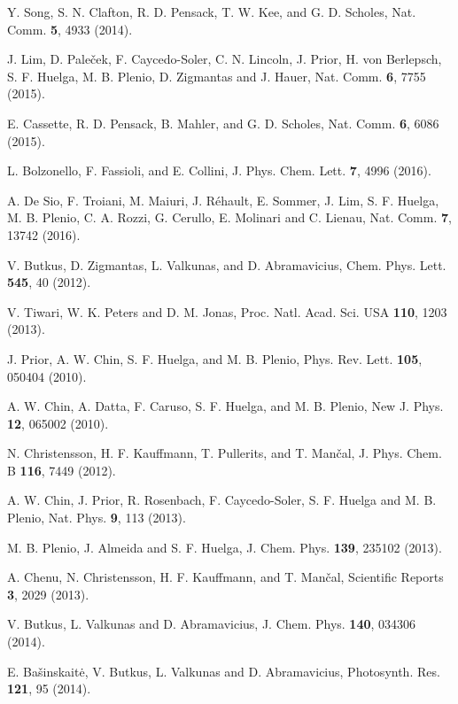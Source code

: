 \documentclass[%
 reprint,%
 amssymb, amsmath,%
 aip,cha,%
]{revtex4-1}
\begin{document}
\begin{thebibliography}{99}
 Y. Song, S. N. Clafton, R. D. Pensack, T. W. Kee, and G. D. Scholes, Nat. Comm. {\bf 5}, 4933 (2014).

 J. Lim, D. Pale{\v c}ek, F. Caycedo-Soler, C. N. Lincoln, J. Prior, H. von Berlepsch, S. F. Huelga, M. B. Plenio, D. Zigmantas and J. Hauer, Nat. Comm. {\bf 6}, 7755 (2015).

 E. Cassette, R. D. Pensack, B. Mahler, and G. D. Scholes, Nat. Comm. {\bf 6}, 6086 (2015).

 L. Bolzonello, F. Fassioli, and E. Collini, J. Phys. Chem. Lett. {\bf 7}, 4996 (2016).

 A. De Sio, F. Troiani, M. Maiuri, J. R{\'e}hault, E. Sommer, J. Lim, S. F. Huelga, M. B. Plenio, C. A. Rozzi, G. Cerullo, E. Molinari and C. Lienau, Nat. Comm. {\bf 7}, 13742 (2016).

 V. Butkus, D. Zigmantas, L. Valkunas, and D. Abramavicius, Chem. Phys. Lett. {\bf 545}, 40 (2012).

 V. Tiwari, W. K. Peters and D. M. Jonas, Proc. Natl. Acad. Sci. USA {\bf 110}, 1203 (2013).

 J. Prior, A. W. Chin, S. F. Huelga, and M. B. Plenio, Phys. Rev. Lett. {\bf 105}, 050404 (2010).

 A. W. Chin, A. Datta, F. Caruso, S. F. Huelga, and M. B. Plenio, New J. Phys. {\bf 12}, 065002 (2010).

 N. Christensson, H. F. Kauffmann, T. Pullerits, and T. Man{\v c}al, J. Phys. Chem. B {\bf 116}, 7449 (2012).

 A. W. Chin, J. Prior, R. Rosenbach, F. Caycedo-Soler, S. F. Huelga and M. B. Plenio, Nat. Phys. {\bf 9}, 113 (2013).

 M. B. Plenio, J. Almeida and S. F. Huelga, J. Chem. Phys. {\bf 139}, 235102 (2013).

 A. Chenu, N. Christensson, H. F. Kauffmann, and T. Man{\v c}al, Scientific Reports {\bf 3}, 2029 (2013).

 V. Butkus, L. Valkunas and D. Abramavicius, J. Chem. Phys. {\bf 140}, 034306 (2014).

 E. Ba{\v s}inskait{\. e}, V. Butkus, L. Valkunas and D. Abramavicius, Photosynth. Res. {\bf 121}, 95 (2014).


\end{thebibliography}
\end{document}
